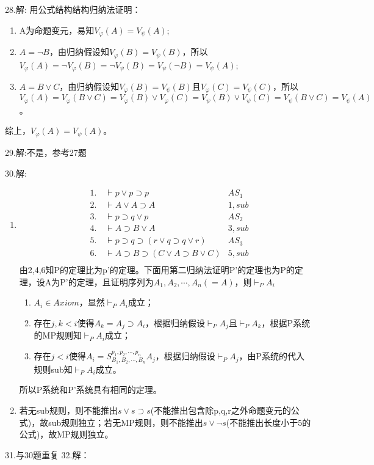 \documentclass[a4paper]{ctexart}
\begin{document}
\noindent 28.解:
用公式结构结构归纳法证明：
\begin{enumerate}
  \item A为命题变元，易知$V_\varphi(A)=V_\psi(A)$;
  \item $A=\neg B$，由归纳假设知$V_\varphi(B)=V_\psi(B)$，所以$V_\varphi(A)=\neg V_\varphi(B)=\neg V_\psi(B)=V_\psi(\neg B)=V_\psi(A)$;
  \item $A=B\vee C$，由归纳假设知$V_\varphi(B)=V_\psi(B)$且$V_\varphi(C)=V_\psi(C)$，所以$V_\varphi(A)=V_\varphi(B\vee C)=V_\varphi(B)\vee V_\varphi(C)=V_\psi(B)\vee V_\psi(C)=V_\psi(B\vee C)=V_\psi(A)$。
\end{enumerate}
综上，$V_\varphi(A)=V_\psi(A)$。\newline

\noindent 29.解:不是，参考27题

\noindent 30.解:
\begin{enumerate}
  \item \begin{align*}
    &1. \quad\vdash p\vee p\supset p &AS_1 \\
    &2. \quad\vdash A\vee A\supset A &1,sub \\
    &3. \quad\vdash p\supset q\vee p &AS_2 \\
    &4. \quad\vdash A\supset B\vee A &3,sub \\
    &5. \quad\vdash p\supset q\supset(r\vee q\supset q\vee r)&AS_3 \\
    &6. \quad\vdash A\supset B\supset(C\vee A\supset B\vee C)&5,sub \\
  \end{align*}
  由2,4,6知P的定理比为p'的定理。下面用第二归纳法证明P'的定理也为P的定理，设A为P'的定理，且证明序列为$A_1,A_2,\cdots,A_n(=A)$，则$\vdash_PA_i$
  \begin{enumerate}
    \item $A_i\in Axiom$，显然$\vdash_PA_i$成立；
    \item 存在$j,k<i$使得$A_k=A_j\supset A_i$，根据归纳假设$\vdash_PA_j$且$\vdash_PA_k$，根据P系统的MP规则知$\vdash_PA_i$成立；
    \item 存在$j<i$使得$A_i=S_{B_1,B_2,\cdots,B_n}^{p_1,p_2,\cdots,p_n}A_j$，根据归纳假设$\vdash_PA_j$，由P系统的代入规则sub知$\vdash_PA_i$成立。
  \end{enumerate}
  所以P系统和P'系统具有相同的定理。
  \item 若无sub规则，则不能推出$s\vee s\supset s$(不能推出包含除p,q,r之外命题变元的公式)，故sub规则独立；若无MP规则，则不能推出$s\vee\neg s$(不能推出长度小于5的公式)，故MP规则独立。
\end{enumerate}
\noindent 31.与30题重复
\noindent 32.解：
\end{document}
